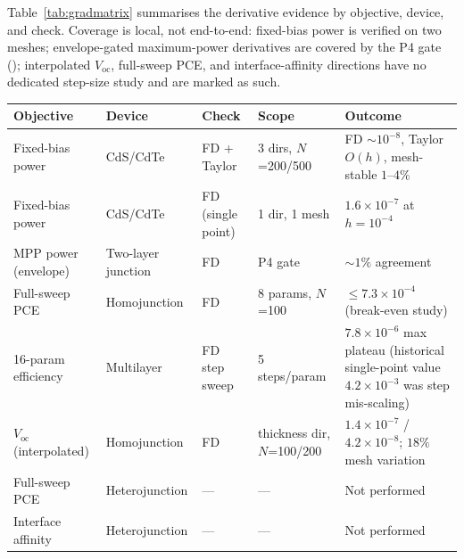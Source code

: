 Table~\ref{tab:gradmatrix} summarises the derivative evidence by
objective, device, and check. Coverage is local, not end-to-end:
fixed-bias power is verified on two meshes; envelope-gated maximum-power
derivatives are covered by the P4 gate
(); interpolated
$V_{\mathrm{oc}}$, full-sweep PCE, and interface-affinity directions
have no dedicated step-size study and are marked as such.
\begin{papertable}
\centering\small
\caption{Derivative verification matrix. Status is per cell: performed
results are reported; empty cells are explicitly not performed.}
\label{tab:gradmatrix}
\begin{tabularx}{\linewidth}{@{}llllX@{}}
\toprule
Objective & Device & Check & Scope & Outcome \\
\midrule
Fixed-bias power & CdS/CdTe & FD + Taylor & 3 dirs, $N$=200/500 &
FD $\sim10^{-8}$, Taylor $O(h)$, mesh-stable $1$--$4\%$ \\
Fixed-bias power & CdS/CdTe & FD (single point) & 1 dir, 1 mesh &
$1.6\times10^{-7}$ at $h=10^{-4}$ \\
MPP power (envelope) & Two-layer junction & FD & P4 gate &
$\sim1\%$ agreement \\
Full-sweep PCE & Homojunction & FD & 8 params, $N$=100 &
$\leq7.3\times10^{-4}$ (break-even study) \\
16-param efficiency & Multilayer & FD step sweep & 5 steps/param &
$7.8\times10^{-6}$ max plateau (historical single-point value
$4.2\times10^{-3}$ was step mis-scaling) \\
$V_{\mathrm{oc}}$ (interpolated) & Homojunction & FD & thickness dir,
$N$=100/200 & $1.4\times10^{-7}$ / $4.2\times10^{-8}$; $18\%$ mesh
variation \\
Full-sweep PCE & Heterojunction & --- & --- & Not performed \\
Interface affinity & Heterojunction & --- & --- & Not performed \\
\bottomrule
\end{tabularx}
\end{papertable}

